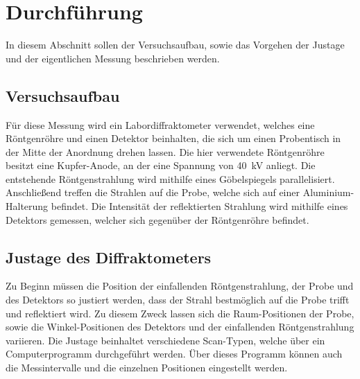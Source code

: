 \section{Durchführung}
\label{sec:durchfuehrung}

In diesem Abschnitt sollen der Versuchsaufbau,
sowie das Vorgehen der Justage und der eigentlichen Messung beschrieben werden.


\subsection{Versuchsaufbau}

Für diese Messung wird ein Labordiffraktometer verwendet,
welches eine Röntgenröhre und einen Detektor beinhalten,
die sich um einen Probentisch in der Mitte der Anordnung drehen lassen.
Die hier verwendete Röntgenröhre besitzt eine Kupfer-Anode,
an der eine Spannung von \SI{40}{\kilo\volt} anliegt.
Die entstehende Röntgenstrahlung wird mithilfe eines Göbelspiegels parallelisiert.
Anschließend treffen die Strahlen auf die Probe,
welche sich auf einer Aluminium-Halterung befindet.
Die Intensität der reflektierten Strahlung wird mithilfe eines Detektors gemessen,
welcher sich gegenüber der Röntgenröhre befindet.


\subsection{Justage des Diffraktometers}

Zu Beginn müssen die Position der einfallenden Röntgenstrahlung,
der Probe und des Detektors so justiert werden,
dass der Strahl bestmöglich auf die Probe trifft und reflektiert wird.
Zu diesem Zweck lassen sich die Raum-Positionen der Probe,
sowie die Winkel-Positionen des Detektors und der einfallenden Röntgenstrahlung variieren.
Die Justage beinhaltet verschiedene Scan-Typen,
welche über ein Computerprogramm durchgeführt werden.
Über dieses Programm können auch die Messintervalle und die einzelnen Positionen eingestellt werden.

